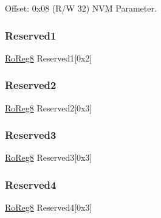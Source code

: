 Offset\+: 0x08 (R/W 32) N\+VM Parameter. 

\mbox{\label{struct_nvmctrl_a3e42d171d4eb8eda7a030a3453f2d9c0}} 
\subsubsection{\texorpdfstring{Reserved1}{Reserved1}}
{\footnotesize\ttfamily \mbox{\hyperlink{group___s_a_m_d21_e15_a__definitions_ga0d957f1433aaf5d70e4dc2b68288442d}{Ro\+Reg8}} Reserved1\mbox{[}0x2\mbox{]}}

\mbox{\label{struct_nvmctrl_a3e3d4b7e35d84b272d434a1396e8b7be}} 
\subsubsection{\texorpdfstring{Reserved2}{Reserved2}}
{\footnotesize\ttfamily \mbox{\hyperlink{group___s_a_m_d21_e15_a__definitions_ga0d957f1433aaf5d70e4dc2b68288442d}{Ro\+Reg8}} Reserved2\mbox{[}0x3\mbox{]}}

\mbox{\label{struct_nvmctrl_ab22abf5c83fa4a01809facc55e0fda29}} 
\subsubsection{\texorpdfstring{Reserved3}{Reserved3}}
{\footnotesize\ttfamily \mbox{\hyperlink{group___s_a_m_d21_e15_a__definitions_ga0d957f1433aaf5d70e4dc2b68288442d}{Ro\+Reg8}} Reserved3\mbox{[}0x3\mbox{]}}

\mbox{\label{struct_nvmctrl_abf127d09ee1c1a9cf2b0d88d946dbe0a}} 
\subsubsection{\texorpdfstring{Reserved4}{Reserved4}}
{\footnotesize\ttfamily \mbox{\hyperlink{group___s_a_m_d21_e15_a__definitions_ga0d957f1433aaf5d70e4dc2b68288442d}{Ro\+Reg8}} Reserved4\mbox{[}0x3\mbox{]}}

